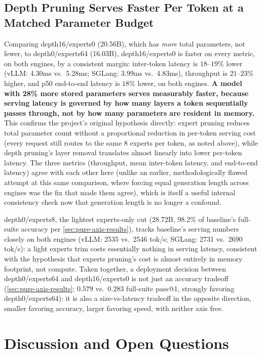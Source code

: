 \documentclass{article}
\theoremstyle{plain}
\theoremstyle{definition}
\theoremstyle{remark}
\begin{document}
\subsection{Depth Pruning Serves Faster Per Token at a Matched Parameter Budget}
\label{sec:inference-benchmark-hypothesis}

Comparing depth16/experts0 (20.56B), which has \emph{more} total
parameters, not fewer, to depth0/experts64 (16.03B), depth16/experts0 is
faster on every metric, on both engines, by a consistent margin: inter-token latency
is $18$--$19\%$ lower (vLLM: 4.30ms vs.\ 5.28ms; SGLang: 3.99ms vs.\
4.83ms), throughput is $21$--$23\%$ higher, and p50 end-to-end latency is
$18\%$ lower, on both engines. \textbf{A model with 28\% more stored
parameters serves measurably faster, because serving latency is governed
by how many layers a token sequentially passes through, not by how many
parameters are resident in memory.} This confirms the project's original
hypothesis directly: expert pruning reduces total parameter count without
a proportional reduction in per-token serving cost (every request still
routes to the same 8 experts per token, as noted above),
while depth pruning's layer removal translates almost linearly into lower
per-token latency. The three metrics (throughput, mean inter-token
latency, and end-to-end latency) agree with each other here (unlike an
earlier, methodologically flawed attempt at this same comparison, where
forcing equal generation length across engines was the fix that made them
agree), which is itself a useful internal consistency check now that
generation length is no longer a confound.

depth0/experts8, the lightest experts-only cut (28.72B, 98.2\% of
baseline's full-suite accuracy per \cref{sec:pure-axis-results}), tracks
baseline's serving numbers closely on both engines (vLLM: 2535 vs.\ 2546
tok/s; SGLang: 2731 vs.\ 2690 tok/s): a light experts trim costs
essentially nothing in serving latency, consistent with the hypothesis
that experts pruning's cost is almost entirely in memory footprint, not
compute. Taken together, a deployment decision between depth0/experts64
and depth16/experts0 is not just an accuracy tradeoff
(\cref{sec:pure-axis-results}: $0.579$ vs.\ $0.283$ full-suite pass@1,
strongly favoring depth0/experts64): it is also a size-vs-latency
tradeoff in the opposite direction, smaller favoring accuracy, larger
favoring speed, with neither axis free.

\section{Discussion and Open Questions}
\label{sec:discussion}
\end{document}

